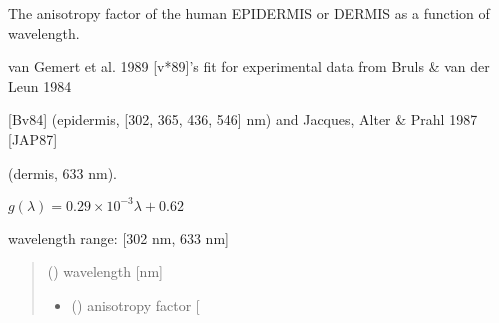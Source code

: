 \documentclass[letterpaper,10pt,english]{sphinxmanual}
\begin{document}
\begin{fulllineitems}
\label{\detokenize{06_anisotropy_factor:skinoptics.anisotropy_factor.g_vanGemert}}
\pysigstartsignatures
{}
\pysigstopsignatures
\begin{DUlineblock}{0em}
\item[] The anisotropy factor of the human EPIDERMIS or DERMIS as a function of wavelength.
\item[] van Gemert et al. 1989 {[}v*89{]}’s fit for experimental data from Bruls \& van der Leun 1984
\item[] {[}Bv84{]} (epidermis, {[}302, 365, 436, 546{]} nm) and Jacques, Alter \& Prahl 1987 {[}JAP87{]}
\item[] (dermis, 633 nm).
\end{DUlineblock}

\sphinxAtStartPar
\(g(\lambda) = 0.29 \times 10^{-3} \lambda + 0.62\)

\begin{DUlineblock}{0em}
\item[] wavelength range: {[}302 nm, 633 nm{]}
\end{DUlineblock}
\begin{quote}\begin{description}
\sphinxAtStartPar
{} () \textendash{} wavelength {[}nm{]}

\sphinxAtStartPar
\begin{itemize}
\item {} 
\sphinxAtStartPar
{} () \textendash{} anisotropy factor {[}\sphinxhyphen{}{]}

\end{itemize}


\end{description}\end{quote}

\end{fulllineitems}

\end{document}
